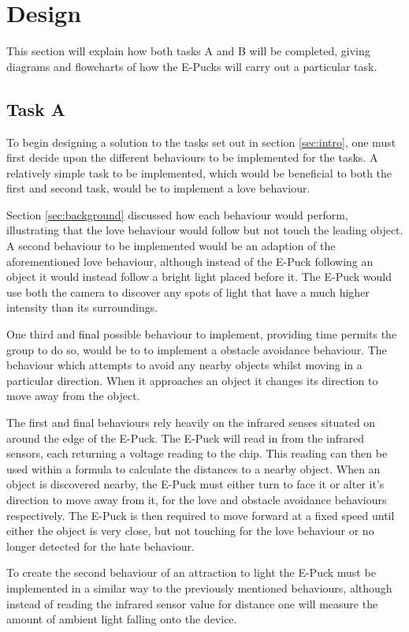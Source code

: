 \section{Design}
\label{sec:design}
This section will explain how both tasks A and B will be completed, giving diagrams and flowcharts of how the E-Pucks will carry out a particular task.
\subsection{Task A}
To begin designing a solution to the tasks set out in section \ref{sec:intro}, one must first decide upon the different behaviours to be implemented for the tasks. A relatively simple task to be implemented, which would be beneficial to both the first and second task, would be to implement a love behaviour.

Section \ref{sec:background} discussed how each behaviour would perform, illustrating that the love behaviour would follow but not touch the leading object. A second behaviour to be implemented would be an adaption of the aforementioned love behaviour, although instead of the E-Puck following an object it would instead follow a bright light placed before it. The E-Puck would use both the camera to discover any spots of light that have a much higher intensity than its surroundings.

One third and final possible behaviour to implement, providing time permits the group to do so, would be to to implement a obstacle avoidance behaviour. The behaviour which attempts to avoid any nearby objects whilst moving in a particular direction. When it approaches an object it changes its direction to move away from the object.

The first and final behaviours rely heavily on the infrared senses situated on around the edge of the E-Puck. The E-Puck will read in from the infrared sensors, each returning a voltage reading to the chip. This reading can then be used within a formula to calculate the distances to a nearby object. When an object is discovered nearby, the E-Puck must either turn to face it or alter it's direction to move away from it, for the love and obstacle avoidance behaviours respectively. The E-Puck is then required to move forward at a fixed speed until either the object is very close, but not touching for the love behaviour or no longer detected for the hate behaviour.

To create the second behaviour of an attraction to light the E-Puck must be implemented in a similar way to the previously mentioned behaviours, although instead of reading the infrared sensor value for distance one will measure the amount of ambient light falling onto the device.

